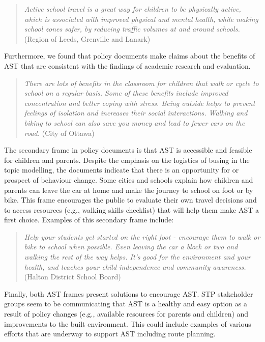 \documentclass[preprint, 3p,
authoryear]{elsarticle} %
\begin{document}
\begin{quote}
\emph{Active school travel is a great way for children to be physically
active, which is associated with improved physical and mental health,
while making school zones safer, by reducing traffic volumes at and
around schools.}(Region of Leeds, Grenville and Lanark)
\end{quote}

Furthermore, we found that policy documents make claims about the
benefits of AST that are consistent with the findings of academic
research and evaluation.

\begin{quote}
\emph{There are lots of benefits in the classroom for children that walk
or cycle to school on a regular basis. Some of these benefits include
improved concentration and better coping with stress. Being outside
helps to prevent feelings of isolation and increases their social
interactions. Walking and biking to school can also save you money and
lead to fewer cars on the road.} (City of Ottawa)
\end{quote}

The secondary frame in policy documents is that AST is accessible and
feasible for children and parents. Despite the emphasis on the logistics
of busing in the topic modelling, the documents indicate that there is
an opportunity for or prospect of behaviour change. Some cities and
schools explain how children and parents can leave the car at home and
make the journey to school on foot or by bike. This frame encourages the
public to evaluate their own travel decisions and to access resources
(e.g., walking skills checklist) that will help them make AST a first
choice. Examples of this secondary frame include:

\begin{quote}
\emph{Help your students get started on the right foot - encourage them
to walk or bike to school when possible. Even leaving the car a block or
two and walking the rest of the way helps. It's good for the environment
and your health, and teaches your child independence and community
awareness.} (Halton District School Board)
\end{quote}

Finally, both AST frames present solutions to encourage AST. STP
stakeholder groups seem to be communicating that AST is a healthy and
easy option as a result of policy changes (e.g., available resources for
parents and children) and improvements to the built environment. This
could include examples of various efforts that are underway to support
AST including route planning.
\end{document}
